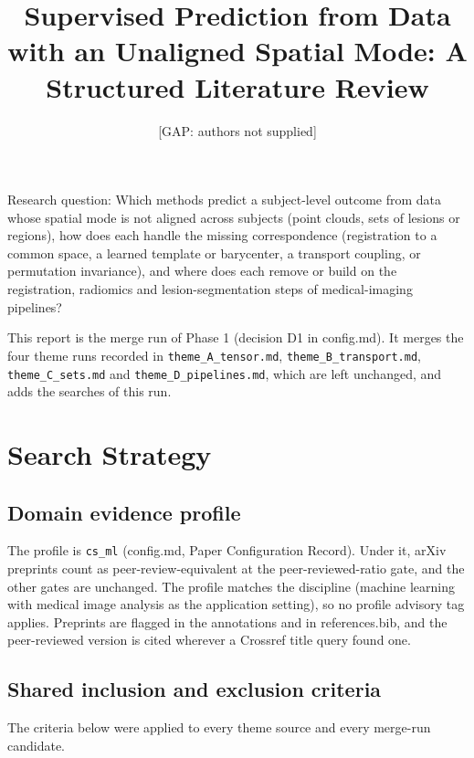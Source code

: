 \documentclass[journal,onecolumn]{IEEEtran}
\begin{document}
\title{Supervised Prediction from Data with an Unaligned Spatial Mode: A Structured Literature Review}
\author{[GAP: authors not supplied]}

\maketitle

Research question: Which methods predict a subject-level outcome from data whose spatial mode is not aligned across subjects (point clouds, sets of lesions or regions), how does each handle the missing correspondence (registration to a common space, a learned template or barycenter, a transport coupling, or permutation invariance), and where does each remove or build on the registration, radiomics and lesion-segmentation steps of medical-imaging pipelines?

This report is the merge run of Phase 1 (decision D1 in config.md). It merges the four theme runs recorded in \nolinkurl{theme_A_tensor.md}, \nolinkurl{theme_B_transport.md}, \nolinkurl{theme_C_sets.md} and \nolinkurl{theme_D_pipelines.md}, which are left unchanged, and adds the searches of this run.

\section{Search Strategy}

\subsection{Domain evidence profile}

The profile is \texttt{cs\_ml} (config.md, Paper Configuration Record). Under it, arXiv preprints count as peer-review-equivalent at the peer-reviewed-ratio gate, and the other gates are unchanged. The profile matches the discipline (machine learning with medical image analysis as the application setting), so no profile advisory tag applies. Preprints are flagged in the annotations and in references.bib, and the peer-reviewed version is cited wherever a Crossref title query found one.

\subsection{Shared inclusion and exclusion criteria}

The criteria below were applied to every theme source and every merge-run candidate.
\end{document}
